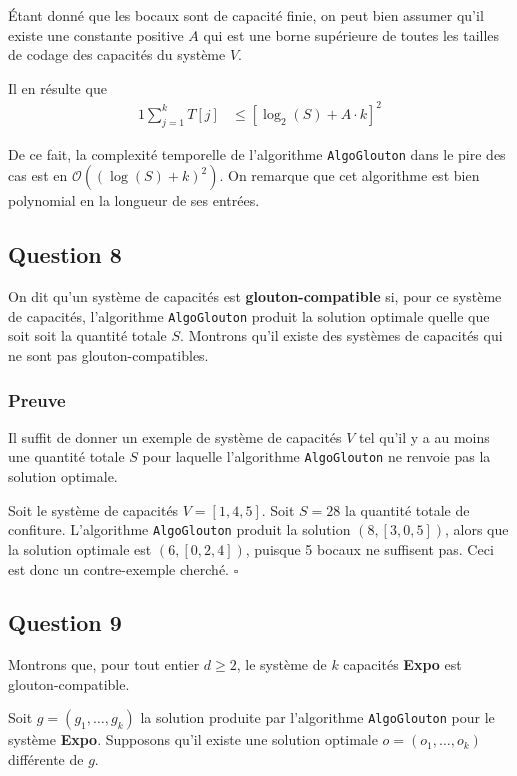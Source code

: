 \documentclass[12pt,a4paper]{article}
\newcommand{\BigO}{\mathcal{O}}
\begin{document}
\'Etant donn\'e que les bocaux sont de capacit\'e finie, on peut bien assumer qu'il existe une constante positive $A$ qui est une borne sup\'erieure de toutes les tailles de codage des capacit\'es du syst\`eme $V$.

Il en r\'esulte que
\begin{alignat*}{1}
 \sum_{j=1}^{k} T[j] &\leq \left[\log_2(S) + A\cdot k\right]^2
\end{alignat*}

De ce fait, la complexit\'e temporelle de l'algorithme \texttt{AlgoGlouton} dans le pire des cas est en $\BigO((\log(S) + k)^2)$. On remarque que cet algorithme est bien polynomial en la longueur de ses entr\'ees.

\subsection*{Question 8}
 On dit qu'un syst\`eme de capacit\'es est {\bfseries glouton-compatible} si, pour ce syst\`eme de capacit\'es, l'algorithme \texttt{AlgoGlouton} produit la solution optimale quelle que soit soit la quantit\'e totale $S$.
 Montrons qu'il existe des syst\`emes de capacit\'es qui ne sont pas glouton-compatibles.
 
 \subsubsection*{Preuve}
 Il suffit de donner un exemple de syst\`eme de capacit\'es $V$ tel qu'il y a au moins une quantit\'e totale $S$ pour laquelle l'algorithme \texttt{AlgoGlouton} ne renvoie pas la solution optimale.
 
 Soit le syst\`eme de capacit\'es $V = [1, 4, 5]$. Soit $S = 28$ la quantit\'e totale de confiture. L'algorithme \texttt{AlgoGlouton} produit la solution $(8, [3, 0, 5])$, alors que la solution optimale est $(6, [0, 2, 4])$, puisque 5 bocaux ne suffisent pas. Ceci est donc un contre-exemple cherch\'e. \hfill\ensuremath{\square}

\subsection*{Question 9}
 Montrons que, pour tout entier $d \geq 2$, le syst\`eme de $k$ capacit\'es {\bfseries Expo} est glouton-compatible.
 
 Soit $g=(g_1, \dotsc, g_k)$ la solution produite par l'algorithme \texttt{AlgoGlouton} pour le syst\`eme {\bfseries Expo}. Supposons qu'il existe une solution optimale $o = (o_1, \dotsc, o_k)$ diff\'erente de $g$.
\end{document}
